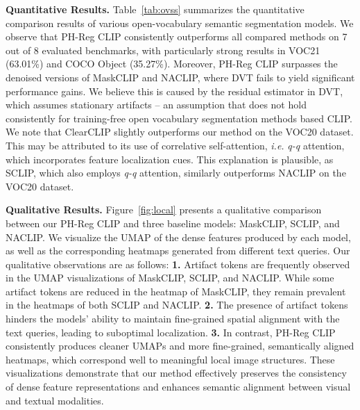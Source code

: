 \documentclass{article}
\begin{document}
\textbf{Quantitative Results.} Table~\ref{tab:ovss} summarizes the quantitative comparison results of various open-vocabulary semantic segmentation models. We observe that PH-Reg CLIP consistently outperforms all compared methods on 7 out of 8 evaluated benchmarks, with particularly strong results in VOC21 (63.01\%) and COCO Object (35.27\%). Moreover, PH-Reg CLIP surpasses the denoised versions of MaskCLIP and NACLIP, where DVT fails to yield significant performance gains. We believe this is caused by the residual estimator in DVT, which assumes stationary artifacts -- an assumption that does not hold consistently for training-free open vocabulary segmentation methods based CLIP. We note that ClearCLIP slightly outperforms our method on the VOC20 dataset. This may be attributed to its use of correlative self-attention, \emph{i.e.} \emph{q-q} attention, which incorporates feature localization cues. This explanation is plausible, as SCLIP, which also employs \emph{q-q} attention, similarly outperforms NACLIP on the VOC20 dataset.

\textbf{Qualitative Results.} Figure~\ref{fig:local} presents a qualitative comparison between our PH-Reg CLIP and three baseline models: MaskCLIP, SCLIP, and NACLIP. We visualize the UMAP of the dense features produced by each model, as well as the corresponding heatmaps generated from different text queries.
Our qualitative observations are as follows:
\textbf{1.} Artifact tokens are frequently observed in the UMAP visualizations of MaskCLIP, SCLIP, and NACLIP. While some artifact tokens are reduced in the heatmap of MaskCLIP, they remain prevalent in the heatmaps of both SCLIP and NACLIP.
\textbf{2.} The presence of artifact tokens hinders the models' ability to maintain fine-grained spatial alignment with the text queries, leading to suboptimal localization.
\textbf{3.} In contrast, PH-Reg CLIP consistently produces cleaner UMAPs and more fine-grained, semantically aligned heatmaps, which correspond well to meaningful local image structures.
These visualizations demonstrate that our method effectively preserves the consistency of dense feature representations and enhances semantic alignment between visual and textual modalities.

\vspace{-.2cm}
\end{document}
